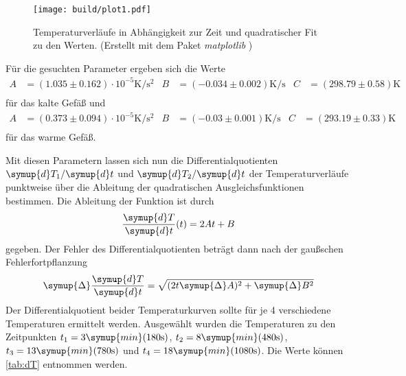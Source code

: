 \begin{figure}
  \centering
  \label{fig:Plot1}
  \texttt{[image: build/plot1.pdf]}
  \caption{Temperaturverläufe in Abhängigkeit zur Zeit und quadratischer Fit zu den Werten. (Erstellt mit dem Paket \textit{matplotlib} \cite{matplotlib})}
\end{figure}

Für die gesuchten Parameter ergeben sich die Werte
\begin{align*}
  A &= (1.035 \pm 0.162)\cdot 10^{-5} \unit{\kelvin\per\second\squared} & B &= (-0.034 \pm 0.002) \unit{\kelvin\per\second} & C &= (298.79 \pm 0.58) \unit{\kelvin} \\
\end{align*}
für das kalte Gefäß und 
\begin{align*}
  A &= (0.373 \pm 0.094)\cdot 10^{-5} \unit{\kelvin\per\second\squared} & B &= (-0.03 \pm 0.001) \unit{\kelvin\per\second} & C &= (293.19 \pm 0.33) \unit{\kelvin} \\
\end{align*}
für das warme Gefäß.

Mit diesen Parametern lassen sich nun die Differentialquotienten $\symup{d}T_1/\symup{d}t$ und $\symup{d}T_2/\symup{d}t$ der Temperaturverläufe punktweise über
die Ableitung der quadratischen Ausgleichsfunktionen bestimmen.
Die Ableitung der Funktion ist durch
\begin{equation*}
  \frac{\symup{d}T}{\symup{d}t} (t) = 2 At + B
\end{equation*}
gegeben. Der Fehler des Differentialquotienten beträgt dann nach der gaußschen Fehlerfortpflanzung 
\begin{equation*}
  \symup{\Delta} \frac{\symup{d}T}{\symup{d}t} = \sqrt{(2t\symup{\Delta}A)^2 + \symup{\Delta}B^2}
\end{equation*}
Der Differentialquotient beider Temperaturkurven sollte für je 4 verschiedene Temperaturen ermittelt werden. Ausgewählt wurden die Temperaturen zu den Zeitpunkten
$t_1 = 3 \symup{min} (180 \unit{\second})$, $t_2 = 8 \symup{min} (480 \unit{\second})$, $t_3 = 13 \symup{min} (780 \unit{\second})$ und 
$t_4 = 18 \symup{min} (1080 \unit{\second})$. Die Werte können \autoref{tab:dT} entnommen werden.

